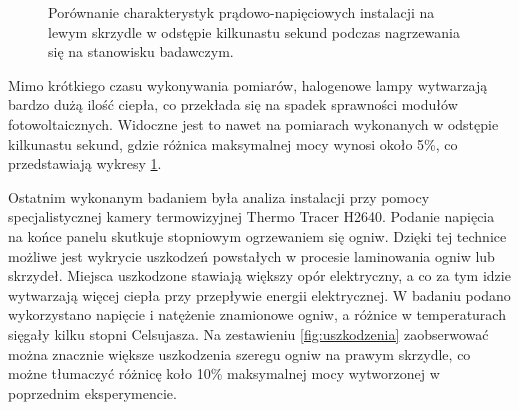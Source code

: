 \documentclass[12pt, a4paper]{article}
\begin{document}
\begin{figure}[ht]
    \centering
    \qquad
    \caption{Porównanie charakterystyk prądowo-napięciowych instalacji na lewym skrzydle w odstępie kilkunastu sekund podczas nagrzewania się na stanowisku badawczym.}
    \label{fig:cieple}
\end{figure}


Mimo krótkiego czasu wykonywania pomiarów, halogenowe lampy wytwarzają bardzo dużą ilość ciepła, co przekłada się na spadek sprawności modułów fotowoltaicznych. Widoczne jest to nawet na pomiarach wykonanych w odstępie kilkunastu sekund, gdzie różnica maksymalnej mocy wynosi około 5\%, co przedstawiają wykresy \ref{fig:cieple}. 

Ostatnim wykonanym badaniem była analiza instalacji przy pomocy specjalistycznej kamery termowizyjnej Thermo Tracer H2640. Podanie napięcia na końce panelu skutkuje stopniowym ogrzewaniem się ogniw. Dzięki tej technice możliwe jest wykrycie uszkodzeń powstałych w procesie laminowania ogniw lub skrzydeł. Miejsca uszkodzone stawiają większy opór elektryczny, a co za tym idzie wytwarzają więcej ciepła przy przepływie energii elektrycznej. W badaniu podano wykorzystano napięcie i natężenie znamionowe ogniw, a różnice w temperaturach sięgały kilku stopni Celsujasza. Na zestawieniu \ref{fig:uszkodzenia} zaobserwować można znacznie większe uszkodzenia szeregu ogniw na prawym skrzydle, co możne tłumaczyć różnicę koło 10\% maksymalnej mocy wytworzonej w poprzednim eksperymencie.
\end{document}
